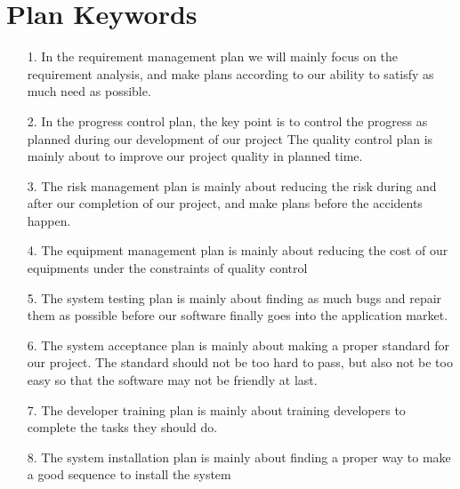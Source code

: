 \documentclass[10pt]{article}
\begin{document}
\section{Plan Keywords}
\begin{itemize}
	\item[1.] In the requirement management plan we will mainly focus on the requirement analysis, and make plans according to our ability to satisfy as much need as possible.

	\item[2.]In the progress control plan, the key point is to control the progress as planned during our development of our project
	The quality control plan is mainly about to improve our project quality in planned time.
	
	\item[3.]The risk management plan is mainly about reducing the risk during and after our completion of our project, and make plans before the accidents happen.
	
	\item[4.]	The equipment management plan is mainly about reducing the cost of our equipments under the constraints of quality control
	
	\item[5.]
	The system testing plan is mainly about finding as much bugs and repair them as possible before our software finally goes into the application market.
	
	\item[6.]
	The system acceptance plan is mainly about making a proper standard for our project. The standard should not be too hard to pass, but also not be too easy so that the software may not be friendly at last.
	
	\item[7.]
	The developer training plan is mainly about training developers to complete the tasks they should do.
	
	\item[8.]
	The system installation plan is mainly about finding a proper way to make a good sequence to install the system
\end{itemize}


\end{document}

